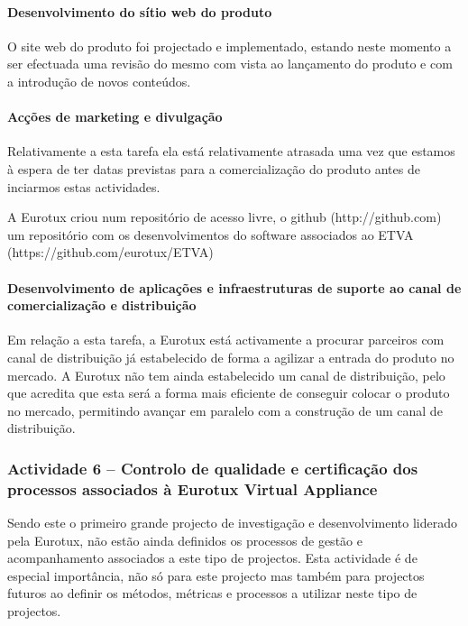 \documentclass[a4paper,12pt,portugues]{article}
\begin{document}
\paragraph{Desenvolvimento do sítio web do produto}

O site web do produto foi projectado e implementado, estando neste momento a
ser efectuada uma revisão do mesmo com vista ao lançamento do produto e com a
introdução de novos conteúdos.

\paragraph{Acções de marketing e divulgação}

Relativamente a esta tarefa ela está relativamente atrasada uma vez que
estamos à espera de ter datas previstas para a comercialização do produto
antes de inciarmos estas actividades.

A Eurotux criou num repositório de acesso livre, o github (http://github.com) um repositório com os desenvolvimentos do software associados ao ETVA (https://github.com/eurotux/ETVA)

\paragraph{Desenvolvimento de aplicações e infraestruturas de suporte ao canal
de comercialização e distribuição}

Em relação a esta tarefa, a Eurotux está activamente a procurar parceiros com
canal de distribuição já estabelecido de forma a agilizar a entrada do produto
no mercado. A Eurotux não tem ainda estabelecido um canal de distribuição,
pelo que acredita que esta será a forma mais eficiente de conseguir colocar o
produto no mercado, permitindo avançar em paralelo com a construção de um canal
de distribuição.

\subsubsection{Actividade 6 – Controlo de qualidade e certificação dos
processos associados à Eurotux Virtual Appliance}

Sendo este o primeiro grande projecto de investigação e desenvolvimento
liderado pela Eurotux, não estão ainda definidos os processos de gestão e
acompanhamento associados a este tipo de projectos. Esta actividade é de
especial importância, não só para este projecto mas também para projectos
futuros ao definir os métodos, métricas e processos a utilizar neste tipo de
projectos.
\end{document}
